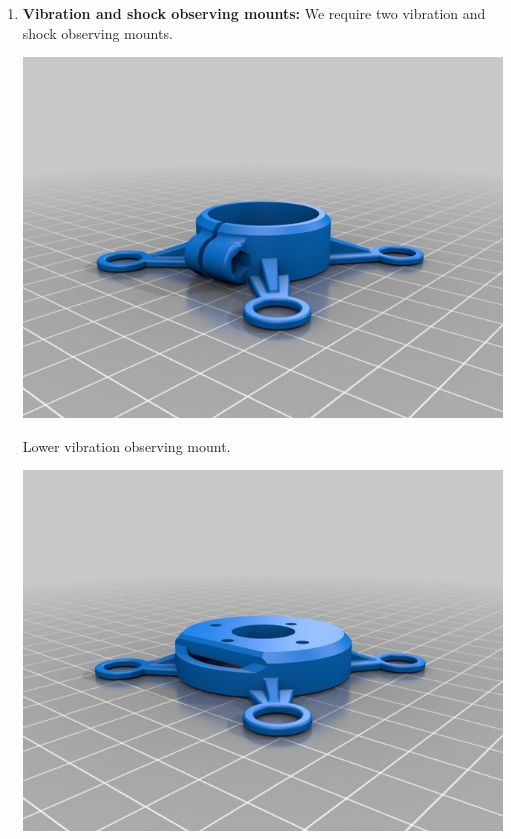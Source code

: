 \documentclass[11pt,a4paper]{article}
\begin{document}
		\begin{enumerate}
			\item \textbf{Vibration and shock observing mounts:} We require two vibration and shock observing mounts.
			\begin{center}
				\includegraphics[scale=0.5]{lower_vibration_observing_mount.jpg}
			\end{center}
			\begin{center}
				Lower vibration observing mount.
			\end{center}
			\begin{center}
				\includegraphics[scale=0.5]{upper_vibration_observing_mount.jpg}
			\end{center}

\end{enumerate}
\end{document}
